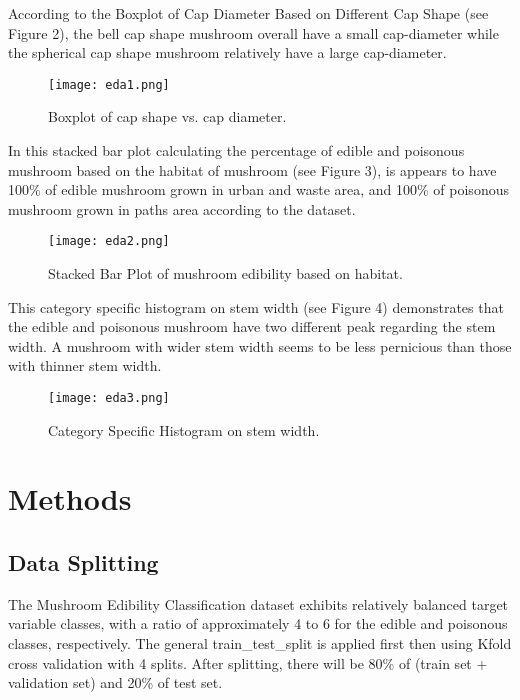 \documentclass{article}
\begin{document}
\newpage
According to the Boxplot of Cap Diameter Based on Different Cap Shape (see Figure 2), the bell cap shape mushroom overall have a small cap-diameter while the spherical cap shape mushroom relatively have a large cap-diameter.

\begin{figure}[h]
\centering
\texttt{[image: eda1.png]}
\caption{\label{fig:boxplot} Boxplot of cap shape vs. cap diameter.}
\end{figure}

In this stacked bar plot calculating the percentage of edible and poisonous mushroom based on the habitat of mushroom (see Figure 3), is appears to have 100\% of edible mushroom grown in urban and waste area, and 100\% of poisonous mushroom grown in paths area according to the dataset. 

\begin{figure}[h]
\centering
\texttt{[image: eda2.png]}
\caption{\label{fig:boxplot} Stacked Bar Plot of mushroom edibility based on habitat.}
\end{figure}

\newpage
This category specific histogram on stem width (see Figure 4) demonstrates that the edible and poisonous mushroom have two different peak regarding the stem width. A mushroom with wider stem width seems to be less pernicious than those with thinner stem width.

\begin{figure}[h]
\centering
\texttt{[image: eda3.png]}
\caption{\label{fig:histogram} Category Specific Histogram on stem width.}
\end{figure}


\section{Methods}

\subsection{Data Splitting}

\hspace{0.5cm} The Mushroom Edibility Classification dataset exhibits relatively balanced target variable classes, with a ratio of approximately 4 to 6 for the edible and poisonous classes, respectively. The general train\_test\_split is applied first then using Kfold cross validation with 4 splits. After splitting, there will be 80\% of (train set + validation set) and 20\% of test set.
\end{document}
